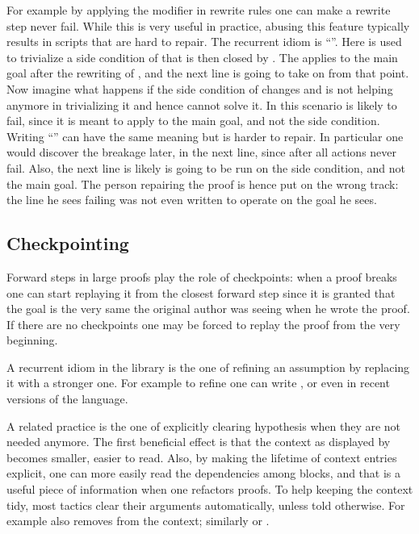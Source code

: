 For example by applying the 
modifier in rewrite rules one can make a rewrite step never fail.
While this is very useful in practice,
abusing this feature typically results in scripts that are hard to
repair. The recurrent idiom is ``''.
Here  is used to trivialize a side condition of  that
is then closed by \C{//}. The  applies to the main goal
after the rewriting of , and the next line is going to take
on from that point.
Now imagine what happens if the side condition of  changes and
 is not helping anymore in trivializing it and hence
\C{//} cannot solve it. In this scenario  is likely to fail,
since it is meant to apply to the main goal, and not the side
condition.\\
Writing ``'' can have the same meaning but
is harder to repair. In particular one would discover the breakage
later, in the next line, since after  all actions never fail.
Also, the next line is likely is going to be run on the side
condition, and not the main goal. The person repairing the proof is
hence put on the wrong track: the line he sees failing was not even
written to operate on the goal he sees.

\subsection{Checkpointing}

Forward steps in large proofs play the role of checkpoints:
when a proof breaks one can start replaying it from the closest
forward step since it is granted that the goal is the very same
the original author was seeing when he wrote the proof. If there are
no checkpoints one may be forced to replay the proof from the very
beginning.

A recurrent idiom in the \mcbMC{} library is the one of refining an
assumption by replacing it with a stronger one. For example to refine
 one can write , or even  in recent versions of the \mcbSSR{} language.

A related practice is the one of explicitly clearing hypothesis when
they are not needed anymore. The first beneficial effect is that the
context as displayed by \Coq{} becomes smaller, easier to read.  Also,
by making the lifetime of context entries explicit, one can more
easily read the dependencies among blocks, and that is a useful piece
of information when one refactors proofs.  To help keeping the context
tidy, most tactics clear their arguments automatically, unless told
otherwise. For example  also removes  from the
context; similarly  or .

